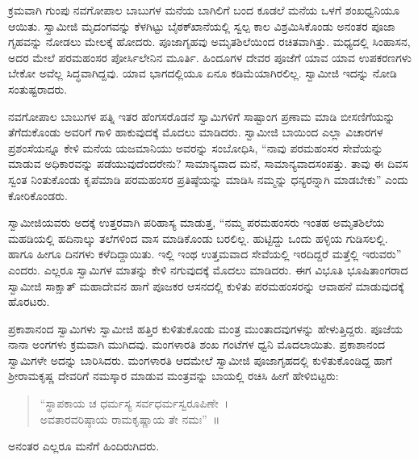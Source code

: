 \vskip 2pt

 ಕ್ರಮವಾಗಿ ಗುಂಪು ನವಗೋಪಾಲ ಬಾಬುಗಳ ಮನೆಯ ಬಾಗಿಲಿಗೆ ಬಂದ ಕೂಡಲೆ ಮನೆಯ ಒಳಗೆ ಶಂಖಧ್ವನಿಯೂ ಆಯಿತು. ಸ್ವಾಮೀಜಿ ಮೃದಂಗವನ್ನು ಕೆಳಗಿಟ್ಟು ಬೈಠಕ್‍ಖಾನೆಯಲ್ಲಿ ಸ್ವಲ್ಪ ಕಾಲ ವಿಶ್ರಮಿಸಿಕೊಂಡು ಅನಂತರ ಪೂಜಾ ಗೃಹವನ್ನು ನೋಡಲು ಮೇಲಕ್ಕೆ ಹೋದರು. ಪೂಜಾಗೃಹವು ಅಮೃತಶಿಲೆಯಿಂದ ರಚಿತವಾಗಿತ್ತು. ಮಧ್ಯದಲ್ಲಿ ಸಿಂಹಾಸನ, ಅದರ ಮೇಲೆ ಪರಮಹಂಸರ ಪೋರ್ಸಿ‍‍ಲೇನಿನ ಮೂರ್ತಿ. ಹಿಂದೂಗಳ ದೇವರ ಪೂಜೆಗೆ ಯಾವ ಯಾವ ಉಪಕರಣಗಳು ಬೇಕೋ ಅವೆಲ್ಲ ಸಿದ್ಧವಾಗಿದ್ದವು. ಯಾವ ಭಾಗದಲ್ಲಿಯೂ ಏನೂ ಕಡಿಮೆಯಾಗಿರಲಿಲ್ಲ. ಸ್ವಾಮೀಜಿ ಇದನ್ನು ನೋಡಿ ಸಂತುಷ್ಟರಾದರು. 

\vskip 2pt

 ನವಗೋಪಾಲ ಬಾಬುಗಳ ಪತ್ನಿ ಇತರ ಹೆಂಗಸರೊಡನೆ ಸ್ವಾಮಿಗಳಿಗೆ ಸಾಷ್ಟಾಂಗ ಪ್ರಣಾಮ ಮಾಡಿ ಬೀಸಣಿಗೆಯನ್ನು ತೆಗೆದುಕೊಂಡು ಅವರಿಗೆ ಗಾಳಿ ಹಾಕುವುದಕ್ಕೆ ಮೊದಲು ಮಾಡಿದರು. ಸ್ವಾಮೀಜಿ ಬಾಯಿಂದ ಎಲ್ಲಾ ವಿಚಾರಗಳ ಪ್ರಶಂಸೆಯನ್ನೂ ಕೇಳಿ ಮನೆಯ ಯಜಮಾನಿಯು ಅವರನ್ನು ಸಂಬೋಧಿಸಿ, “ನಾವು ಪರಮಹಂಸರ ಸೇವೆಯನ್ನು ಮಾಡುವ ಅಧಿಕಾರವನ್ನು ಪಡೆಯುವುದೆಂದರೇನು? ಸಾಮಾನ್ಯವಾದ ಮನೆ, ಸಾಮಾನ್ಯವಾದ\break ಸಂಪತ್ತು. ತಾವು ಈ ದಿವಸ ಸ್ವಂತ ನಿಂತುಕೊಂಡು ಕೃಪೆಮಾಡಿ ಪರಮಹಂಸರ ಪ್ರತಿಷ್ಠೆಯನ್ನು ಮಾಡಿಸಿ ನಮ್ಮನ್ನು ಧನ್ಯರನ್ನಾಗಿ ಮಾಡಬೇಕು” ಎಂದು ಕೋರಿಕೊಂಡರು. 

\vskip 2pt

 ಸ್ವಾಮೀಜಿಯವರು ಅದಕ್ಕೆ ಉತ್ತರವಾಗಿ ಪರಿಹಾಸ್ಯ ಮಾಡುತ್ತ, “ನಮ್ಮ ಪರಮಹಂಸರು ಇಂತಹ ಅಮೃತಶಿಲೆಯ ಮಹಡಿಯಲ್ಲಿ ಹದಿನಾಲ್ಕು ತಲೆಗಳಿಂದ ವಾಸ ಮಾಡಿಕೊಂಡು ಬರಲಿಲ್ಲ. ಹುಟ್ಟಿದ್ದು ಒಂದು ಹಳ್ಳಿಯ ಗುಡಿಸಲಲ್ಲಿ. ಹಾಗೂ ಹೀಗೂ ದಿನಗಳು ಕಳೆದಿದ್ದಾಯಿತು. ಇಲ್ಲಿ ಇಂಥ ಉತ್ತಮವಾದ ಸೇವೆಯಲ್ಲಿ ಇರದಿದ್ದರೆ ಮತ್ತೆಲ್ಲಿ ಇರುವರು” ಎಂದರು. ಎಲ್ಲರೂ ಸ್ವಾಮಿಗಳ ಮಾತನ್ನು ಕೇಳಿ ನಗುವುದಕ್ಕೆ ಮೊದಲು ಮಾಡಿದರು. ಈಗ ವಿಭೂತಿ ಭೂಷಿತಾಂಗರಾದ ಸ್ವಾಮೀಜಿ ಸಾಕ್ಷಾತ್ ಮಹಾದೇವನ ಹಾಗೆ ಪೂಜಕರ ಆಸನದಲ್ಲಿ ಕುಳಿತು ಪರಮಹಂಸರನ್ನು ಆವಾಹನೆ ಮಾಡುವುದಕ್ಕೆ ಹೊರಟರು. 

 ಪ್ರಕಾಶಾನಂದ ಸ್ವಾಮಿಗಳು ಸ್ವಾಮೀಜಿ ಹತ್ತಿರ ಕುಳಿತುಕೊಂಡು ಮಂತ್ರ ಮುಂತಾದವುಗಳನ್ನು ಹೇಳುತ್ತಿದ್ದರು. ಪೂಜೆಯ ನಾನಾ ಅಂಗಗಳು ಕ್ರಮವಾಗಿ ಮುಗಿದವು. ಮಂಗಳಾರತಿ ಶಂಖ ಗಂಟೆಗಳ ಧ್ವನಿ ಮೊದಲಾಯಿತು. ಪ್ರಕಾಶಾನಂದ ಸ್ವಾಮಿಗಳೇ ಅದನ್ನು ಬಾರಿಸಿದರು. ಮಂಗಳಾರತಿ ಆದಮೇಲೆ ಸ್ವಾಮೀಜಿ ಪೂಜಾಗೃಹದಲ್ಲಿ ಕುಳಿತುಕೊಂಡಿದ್ದ ಹಾಗೆ ಶ‍್ರೀರಾಮಕೃಷ್ಣ ದೇವರಿಗೆ ನಮಸ್ಕಾರ ಮಾಡುವ ಮಂತ್ರವನ್ನು ಬಾಯಲ್ಲಿ ರಚಿಸಿ ಹೀಗೆ ಹೇಳಿಬಿಟ್ಟರು:

\begin{verse}
“ಸ್ಥಾಪಕಾಯ ಚ ಧರ್ಮಸ್ಯ ಸರ್ವಧರ್ಮಸ್ವರೂಪಿಣೇ~। \\ಅವತಾರವರಿಷ್ಠಾಯ ರಾಮಕೃಷ್ಣಾಯ ತೇ ನಮಃ”~॥ 
\end{verse}

 ಅನಂತರ ಎಲ್ಲರೂ ಮನೆಗೆ ಹಿಂದಿರುಗಿದರು. 

